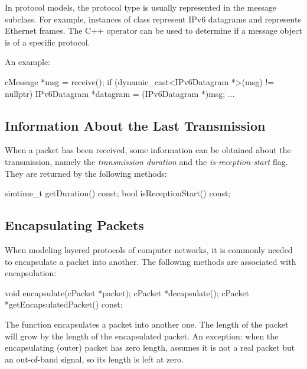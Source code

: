 In {\opp} protocol models, the protocol type is usually represented in the
message subclass. For example, instances of class 
represent IPv6 datagrams and  represents Ethernet
frames. The C++  operator can be used to determine if a
message object is of a specific protocol.

An example:

\begin{cpp}
cMessage *msg = receive();
if (dynamic_cast<IPv6Datagram *>(msg) != nullptr)
{
    IPv6Datagram *datagram = (IPv6Datagram *)msg;
    ...
}
\end{cpp}


\subsection{Information About the Last Transmission}
\label{sec:messages:information-about-last-transmission}

When a packet has been received, some information can be obtained
about the transmission, namely the \textit{transmission duration}
and the \textit{is-reception-start} flag. They are returned by
the following methods:

\begin{cpp}
simtime_t getDuration() const;
bool isReceptionStart() const;
\end{cpp}


\subsection{Encapsulating Packets}
\label{sec:messages:encapsulating-packets}

When modeling layered protocols of computer networks, it is commonly
needed to encapsulate a packet into another.
The following  methods are associated with encapsulation:

\begin{cpp}
void encapsulate(cPacket *packet);
cPacket *decapsulate();
cPacket *getEncapsulatedPacket() const;
\end{cpp}

The  function encapsulates a packet into another one.
The length of the packet will grow by the length of the encapsulated
packet. An exception: when the encapsulating (outer) packet has zero
length, {\opp} assumes it is not a real packet but an out-of-band signal,
so its length is left at zero.

